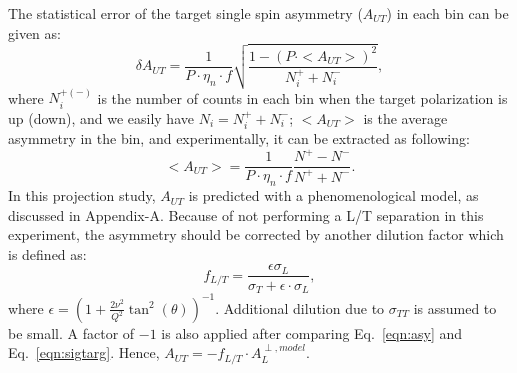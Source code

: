 The statistical error of the target single spin asymmetry ($A_{UT}$) in each
bin can be given as:
  \begin{equation}
    \delta A_{UT} = \frac{1}{P\cdot\eta_{n}\cdot f} \sqrt{\frac{1-(P\cdot
        <A_{UT}>)^{2}}{N^{+}_{i}+N^{-}_{i}}},
    \label{stat_err}
 \end{equation}
where $N^{+(-)}_{i}$ is the number of counts in each bin when the target
polarization is up (down), and we easily have $N_{i}=N^{+}_{i}+N^{-}_{i}$;
$<A_{UT}>$ is the average asymmetry in the bin, and experimentally, it can be
extracted as following:
\begin{equation}
   <A_{UT}> = \frac{1}{P\cdot\eta_{n}\cdot f} \frac{N^{+}-N^{-}}{N^{+}+N^{-}}.
   \label{asym_exp}
\end{equation}
In this projection study, $A_{UT}$ is predicted with a phenomenological model,
as discussed in Appendix-A. Because of not performing a L/T separation in this
experiment, the asymmetry should be corrected by another dilution factor which
is defined as:
\begin{equation}
  f_{L/T} =\frac{\epsilon\sigma_{L} }{\sigma_{T}+\epsilon\cdot\sigma_{L} },
\end{equation} 
where $\epsilon=(1+\frac{2\nu^{2}}{Q^{2}}\tan^{2}(\theta))^{-1}$. Additional
dilution due to $\sigma_{TT}$ is assumed to be small.  A factor of $-1$ is also
applied after comparing Eq.~\ref{eqn:asy} and Eq.~\ref{eqn:sigtarg}. Hence,
$A_{UT} = -f_{L/T}\cdot A_{L}^{\perp,model}$.

